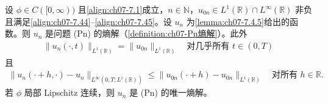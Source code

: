 ﻿\documentclass[../../main.tex]{subfiles}%
\begin{document}
\begin{proposition}\label{proposition:ch07-7.4.7}
设 $\phi\in C([0,\infty))$ 且\eqref{align:ch07-7.1}成立，$n\in\mathbb{N}$，$u_{0n}\in L^1(\mathbb{R})\cap L^\infty(\mathbb{R})$ 非负且满足\eqref{align:ch07-7.44}--\eqref{align:ch07-7.45}。设 $u_n$ 为\cref{lemma:ch07-7.4.5}给出的函数。则 $u_n$ 是问题 (Pn) 的熵解（\cref{definition:ch07-Pn熵解}）。此外
\begin{align}
\|u_n(\cdot,t)\|_{L^1(\mathbb{R})}=\|u_{0n}\|_{L^1(\mathbb{R})}\quad\text{对几乎所有 }t\in(0,T) \label{align:ch07-7.79}
\end{align}
且
\begin{align}
\|u_n(\cdot+h,\cdot)-u_n\|_{L^\infty(0,T;L^1(\mathbb{R}))}
\leqslant\|u_{0n}(\cdot+h)-u_{0n}\|_{L^1(\mathbb{R})}\quad\text{对所有 }h\in\mathbb{R}. \label{align:ch07-7.80}
\end{align}
若 $\phi$ 局部 Lipschitz 连续，则 $u_n$ 是 (Pn) 的唯一熵解。
\end{proposition}
\end{document}
